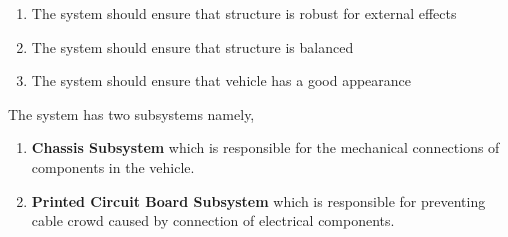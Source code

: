 \documentclass[a4paper,12pt]{article}
\begin{document}
	\begin{enumerate}
		\item The system should	ensure that structure is robust for external effects 
		\item The system should	ensure that structure is balanced
		\item The system should ensure that vehicle has a good appearance
	\end{enumerate}	


	The system has two subsystems namely,
	
	\begin{enumerate}
		\item \textbf{Chassis Subsystem} which is responsible for the mechanical connections of components in the vehicle.
		\item \textbf{Printed Circuit Board Subsystem} which is responsible for preventing cable crowd caused by connection of electrical components.
	\end{enumerate}

\end{document}
